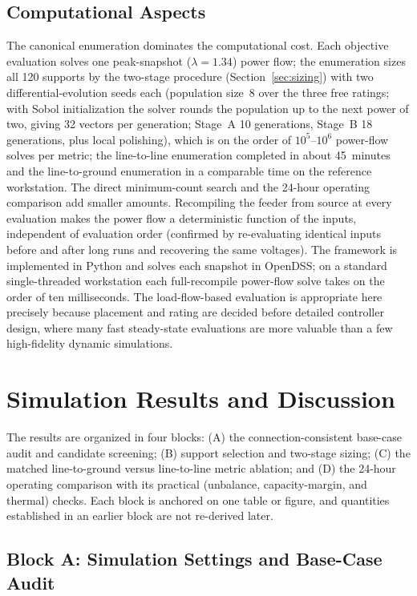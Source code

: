 \documentclass{ieeeaccess}
\begin{document}
\subsection{Computational Aspects}
The canonical enumeration dominates the computational cost. Each objective evaluation solves one peak-snapshot
($\lambda=1.34$) power flow; the enumeration sizes all 120 supports by the two-stage procedure
(Section~\ref{sec:sizing}) with two differential-evolution seeds each (population
size~8 over the three free ratings; with Sobol initialization the solver rounds the
population up to the next power of two, giving 32 vectors per generation; Stage~A 10
generations, Stage~B 18 generations, plus local polishing),
which is on the order of $10^5$--$10^6$ power-flow solves per metric; the
line-to-line enumeration completed in about 45~minutes and the line-to-ground
enumeration in a comparable time on the reference workstation. The direct
minimum-count search and the 24-hour operating comparison add smaller amounts.
Recompiling the feeder from source at every evaluation makes the power flow a
deterministic function of the inputs, independent of evaluation order (confirmed by
re-evaluating identical inputs before and after long runs and recovering the same
voltages). The framework is implemented in Python and solves each snapshot in
OpenDSS; on a standard single-threaded workstation each full-recompile power-flow
solve takes on the order of ten milliseconds. The load-flow-based evaluation is
appropriate here precisely because placement and rating are decided before
detailed controller design, where many fast steady-state evaluations are more
valuable than a few high-fidelity dynamic simulations.

\section{Simulation Results and Discussion}
\label{sec:results}
The results are organized in four blocks: (A) the connection-consistent base-case
audit and candidate screening; (B) support selection and two-stage sizing; (C) the
matched line-to-ground versus line-to-line metric ablation; and (D) the 24-hour
operating comparison with its practical (unbalance, capacity-margin, and thermal)
checks. Each block is anchored on one table or figure, and quantities established in
an earlier block are not re-derived later.

\subsection{Block A: Simulation Settings and Base-Case Audit}
\label{sec:blockA}
\end{document}
